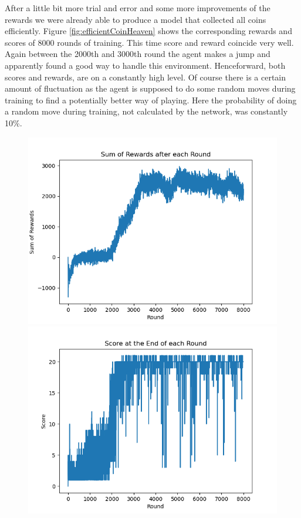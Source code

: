 After a little bit more trial and error and some more improvements of the rewards we were already able to produce a model that collected all coins efficiently. Figure \ref{fig:efficientCoinHeaven} shows the corresponding rewards and scores of 8000 rounds of training. This time score and reward coincide very well. Again between the 2000th and 3000th round the agent makes a jump and apparently found a good way to handle this environment. Henceforward, both scores and rewards, are on a constantly high level. Of course there is a certain amount of fluctuation as the agent is supposed to do some random moves during training to find a potentially better way of playing. Here the probability of doing a random move during training, not calculated by the network, was constantly 10\%.
\begin{figure}[H]
    \centering
    \begin{minipage}{0.49\textwidth}
		\centering
		\includegraphics[scale=0.52]{images/rewards_perfect_coinheaven.png}
    \end{minipage}
    \begin{minipage}{0.49\textwidth}
	\centering
		\includegraphics[scale=0.52]{images/scores_perfect_coinheaven.png}

\end{minipage}
\end{figure}
